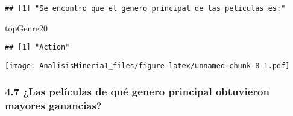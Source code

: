 \documentclass[
]{article}
\newenvironment{Shaded}{\begin{snugshade}}{\end{snugshade}}
\newcommand{\FunctionTok}[1]{\textcolor[rgb]{0.00,0.00,0.00}{#1}}
\newcommand{\NormalTok}[1]{#1}
\newcommand{\OtherTok}[1]{\textcolor[rgb]{0.56,0.35,0.01}{#1}}
\newcommand{\SpecialCharTok}[1]{\textcolor[rgb]{0.00,0.00,0.00}{#1}}
\newcommand{\StringTok}[1]{\textcolor[rgb]{0.31,0.60,0.02}{#1}}
\begin{document}
\begin{verbatim}
## [1] "Se encontro que el genero principal de las peliculas es:"
\end{verbatim}

\begin{Shaded}
\begin{Highlighting}[]
\NormalTok{topGenre20}
\end{Highlighting}
\end{Shaded}

\begin{verbatim}
## [1] "Action"
\end{verbatim}

\begin{Shaded}
\end{Shaded}

\texttt{[image: AnalisisMineria1\_files/figure-latex/unnamed-chunk-8-1.pdf]}

\hypertarget{las-peluxedculas-de-quuxe9-genero-principal-obtuvieron-mayores-ganancias}{%
\subsubsection{4.7 ¿Las películas de qué genero principal obtuvieron
mayores
ganancias?}\label{las-peluxedculas-de-quuxe9-genero-principal-obtuvieron-mayores-ganancias}}

\begin{Shaded}
\end{Shaded}
\end{document}
